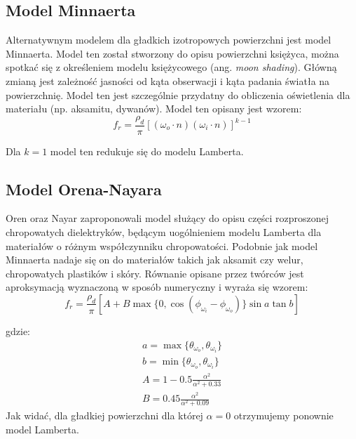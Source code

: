 \documentclass[../main.tex]{subfiles}
\begin{document}
\subsection{Model Minnaerta}

Alternatywnym modelem dla gładkich izotropowych powierzchni jest model
Minnaerta. Model ten został stworzony do opisu powierzchni księżyca, można
spotkać się z określeniem modelu księżycowego (ang. \textit{moon shading}).
Główną zmianą jest zależność jasności od kąta obserwacji i kąta padania światła
na powierzchnię.  Model ten jest szczególnie przydatny do obliczenia
oświetlenia dla materiału (np. aksamitu, dywanów). Model ten opisany jest wzorem:
\begin{equation}
  f_r = \frac{\rho_d}{\pi} \left[
    (\omega_o \cdot n) (\omega_i \cdot n)
  \right]^{k-1}
\end{equation}

\noindent Dla $k=1$ model ten redukuje się do modelu Lamberta.

\subsection{Model Orena-Nayara}

Oren oraz Nayar zaproponowali model służący do opisu części rozproszonej chropowatych
dielektryków, będącym uogólnieniem modelu Lamberta dla materiałów o różnym
współczynniku chropowatości. Podobnie jak model Minnaerta nadaje się on do
materiałów takich jak aksamit czy welur, chropowatych plastików i skóry. Równanie opisane przez twórców jest aproksymacją wyznaczoną w sposób numeryczny i wyraża się wzorem:
\begin{equation}
  f_r = \frac{\rho_d}{\pi} \left[
    A +
    B
      \max\{ 0, \cos\left(\phi_{\omega_i} - \phi_{\omega_o}\right) \}
      \sin a \tan b
  \right]
\end{equation}


\noindent gdzie:
\begin{equation}
\begin{gathered}
  a = \max \{ \theta_{\omega_o}, \theta_{\omega_i} \} \\
  b = \min \{ \theta_{\omega_o}, \theta_{\omega_i} \} \\
  A = 1 - 0.5 \frac{\alpha^2}{\alpha^2 + 0.33} \\
  B = 0.45 \frac{\alpha^2}{\alpha^2 + 0.09}
\end{gathered}
\end{equation}
Jak widać, dla gładkiej powierzchni dla której $\alpha=0$ otrzymujemy
ponownie model Lamberta.
\end{document}
